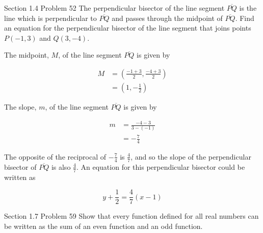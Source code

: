 \documentclass{article}
\begin{document}
    \begin{tbhtheorem}{Section 1.4 Problem 52}
        The perpendicular bisector of the line segment $\overline{PQ}$ is the line which is perpendicular to $\overline{PQ}$ and passes through the midpoint of $\overline{PQ}$. Find an equation for the
        perpendicular bisector of the line segment that joins points $P(-1,3)$ and $Q(3,-4)$.
    \end{tbhtheorem}

    \noindent The midpoint, $M$, of the line segment $\overline{PQ}$ is given by

    \begin{align*}
        M &= \left(\frac{-1+3}{2}, \frac{-4+3}{2} \right) \\
          &= \left(1, -\frac{1}{2}\right)
    \end{align*}

    \noindent The slope, $m$, of the line segment $\overline{PQ}$ is given by

    \begin{align*}
        m   &=  \frac{-4-3}{3-(-1)} \\
            &= -\frac{7}{4}
    \end{align*}

    \pagebreak
    \thispagestyle{page5}

    \noindent The opposite of the reciprocal of $-\frac{7}{4}$ is $\frac{4}{7}$, and so the slope of the perpendicular bisector of $\overline{PQ}$ is also $\frac{4}{7}$. An equation for this perpendicular bisector
    could be written as

    \[
        y + \frac{1}{2} = \frac{4}{7} \left(x - 1\right)
    \]



    \begin{tbhtheorem}{Section 1.7 Problem 59}
        Show that every function defined for all real numbers can be written as the sum of an even function and an odd function.
    \end{tbhtheorem}
\end{document}
